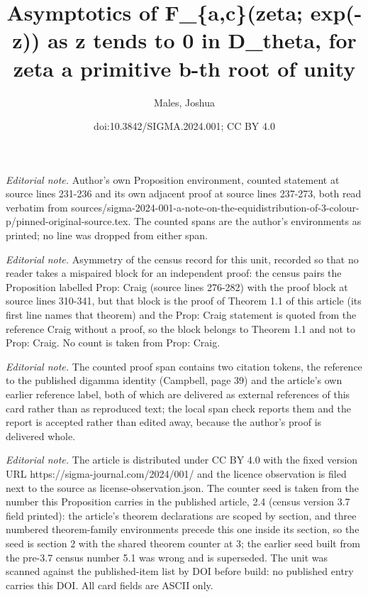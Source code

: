 \documentclass[10pt,a4paper]{amsart}
\title{Asymptotics of F\_\{a,c\}(zeta; exp(-z)) as z tends to 0 in D\_theta, for zeta a primitive b-th root of unity}
\author{Males, Joshua}
\date{doi:10.3842/SIGMA.2024.001; CC BY 4.0}
\numberwithin{equation}{section}
\begin{document}
\maketitle
\setcounter{section}{2}
\setcounter{Theorem}{3}
\noindent\textit{Editorial note.} Author's own Proposition environment, counted statement at source lines 231-236 and its own adjacent proof at source lines 237-273, both read verbatim from sources/sigma-2024-001-a-note-on-the-equidistribution-of-3-colour-p/pinned-original-source.tex. The counted spans are the author's environments as printed; no line was dropped from either span.\par\medskip
\noindent\textit{Editorial note.} Asymmetry of the census record for this unit, recorded so that no reader takes a mispaired block for an independent proof: the census pairs the Proposition labelled Prop: Craig (source lines 276-282) with the proof block at source lines 310-341, but that block is the proof of Theorem 1.1 of this article (its first line names that theorem) and the Prop: Craig statement is quoted from the reference Craig without a proof, so the block belongs to Theorem 1.1 and not to Prop: Craig. No count is taken from Prop: Craig.\par\medskip
\noindent\textit{Editorial note.} The counted proof span contains two citation tokens, the reference to the published digamma identity (Campbell, page 39) and the article's own earlier reference label, both of which are delivered as external references of this card rather than as reproduced text; the local span check reports them and the report is accepted rather than edited away, because the author's proof is delivered whole.\par\medskip
\noindent\textit{Editorial note.} The article is distributed under CC BY 4.0 with the fixed version URL https://sigma-journal.com/2024/001/ and the licence observation is filed next to the source as license-observation.json. The counter seed is taken from the number this Proposition carries in the published article, 2.4 (census version 3.7 field printed): the article's theorem declarations are scoped by section, and three numbered theorem-family environments precede this one inside its section, so the seed is section 2 with the shared theorem counter at 3; the earlier seed built from the pre-3.7 census number 5.1 was wrong and is superseded. The unit was scanned against the published-item list by DOI before build: no published entry carries this DOI. All card fields are ASCII only.\par\medskip
\end{document}
